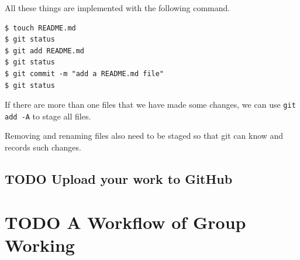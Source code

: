 \documentclass[a4paper,11pt]{article}
\begin{document}
All these things are implemented with the following command.
\begin{verbatim}
$ touch README.md
$ git status
$ git add README.md
$ git status
$ git commit -m "add a README.md file"
$ git status
\end{verbatim}

If there are more than one files that we have made some changes, we
can use \texttt{git add -A} to stage all files.

Removing and renaming files also need to be staged so that
git can know and records such changes.


\subsection{{\bfseries\sffamily TODO} Upload your work to GitHub}
\label{sec:orgf314fd6}


\section{{\bfseries\sffamily TODO} A Workflow of Group Working}
\label{sec:orgcb4f5f1}
\end{document}
